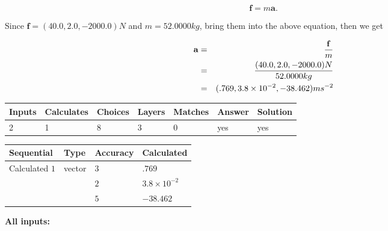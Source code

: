 \documentclass[12pt]{article}
\begin{document}
\[
\mathbf{f}=m\mathbf{a}.
\]
 
Since $\mathbf{f}= %
(40.0 , 2.0 , -2000.0) N$
and $m= %
52.0000kg$, bring them into the above equation, then we get
 
\begin{eqnarray*}
\mathbf{a}&=&\frac{\mathbf{f}}m  \\
&=&\frac{ %
(40.0 , 2.0 , -2000.0) N}{ %
52.0000kg}  \\
&=& %
(.769 , 3.8 \times 10^{-2} , -38.462) ms^{-2}
\end{eqnarray*}
 
 
 
\noindent{}
 
 

 
\vspace{0.3in}
   
   
   
   
\noindent\begin{tabular}{|l|l|l|l|l|l|l|}
 \hline
Inputs & Calculates & Choices & Layers & Matches & Answer & Solution \\ \hline
           2 & 
           1 & 
           8
  & 
           3 & 
           0 & 
  yes & 
  yes 
  \\ \hline
 \end{tabular}
   
   
   
   
\noindent{}
   
   
  
  
\noindent\begin{tabular}{|l|l|l|l|}
\hline
 Sequential & Type & Accuracy & Calculated \\ 
\hline
 
 
  Calculated $           1$ & vector &  
  $           3 $ 
 &  $ .769 $ 
 \\    
  & & 
  $           2 $ 
 &  $ 3.8 \times 10^{-2} $ 
 \\    
  & & 
  $           5 $ 
 &  $ -38.462 $ 
 \\  \hline  
 \end{tabular}
   
   
   
   
\noindent\vspace{0.1in}\hspace{-0.08in} {\textbf{\Large{All inputs: }}}
   
\end{document}
